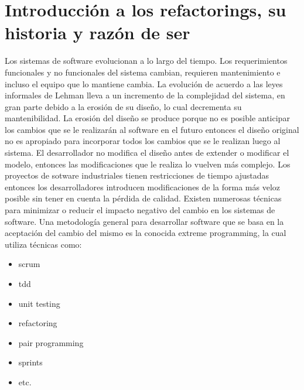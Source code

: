 \section{Introducción a los refactorings, su historia y razón de ser}
Los sistemas de software evolucionan a lo largo del tiempo. Los requerimientos funcionales y no
funcionales del sistema cambian, requieren mantenimiento e incluso el equipo que lo mantiene cambia.
La evolución de acuerdo a las leyes informales de Lehman lleva a un incremento de la complejidad del
sistema, en gran parte debido a la erosión de su diseño, lo cual decrementa su mantenibilidad.
La erosión del diseño se produce porque no es posible anticipar los cambios que se le realizarán al
software en el futuro entonces el diseño original no es apropiado para incorporar todos los cambios
que se le realizan luego al sistema. El desarrollador no modifica el diseño antes de extender o
modificar el modelo, entonces las modificaciones que le realiza lo vuelven más complejo. Los
proyectos de sotware industriales tienen restricciones de tiempo ajustadas entonces los desarrolladores
introducen modificaciones de la forma más veloz posible sin tener en cuenta la pérdida de calidad.
Existen numerosas técnicas
para minimizar o reducir el impacto negativo del cambio en los sistemas de software. Una metodología
general para desarrollar software que se basa en la aceptación del cambio del mismo es la conocida
extreme programming, la cual utiliza técnicas como:

\begin{itemize}
    \item scrum
    \item tdd
    \item unit testing
    \item refactoring
    \item pair programming
    \item sprints
    \item etc.
\end{itemize}

